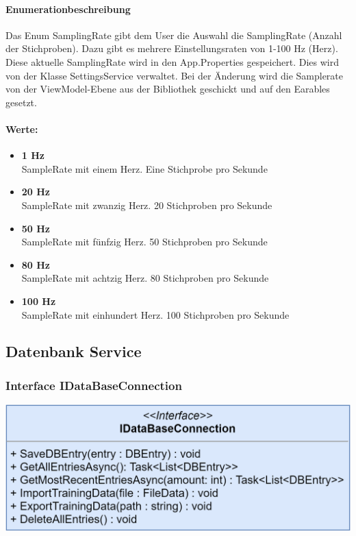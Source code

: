 \documentclass[a4paper,12pt]{article}
\begin{document}
	\paragraph{Enumerationbeschreibung}
	Das Enum SamplingRate gibt dem User die Auswahl die SamplingRate (Anzahl der Stichproben). Dazu gibt es mehrere Einstellungsraten von 1-100 Hz (Herz). Diese aktuelle SamplingRate wird in den App.Properties gespeichert. Dies wird von der Klasse SettingsService verwaltet. 
	Bei der Änderung wird die Samplerate von der ViewModel-Ebene aus der Bibliothek geschickt und auf den \Gls{Earables} gesetzt.

	
	\paragraph{Werte:}
	\begin{itemize}
		\item \textbf{1 Hz}\\SampleRate mit einem Herz. Eine Stichprobe pro Sekunde
		\item \textbf{20 Hz}\\SampleRate mit zwanzig Herz. 20 Stichproben pro Sekunde
		\item \textbf{50 Hz}\\SampleRate mit fünfzig Herz. 50 Stichproben pro Sekunde
		\item \textbf{80 Hz}\\SampleRate mit achtzig Herz. 80 Stichproben pro Sekunde
		\item \textbf{100 Hz}\\SampleRate mit einhundert Herz. 100 Stichproben pro Sekunde
	\end{itemize}
	
	
	
	
	
	
	
\subsection{Datenbank Service}
\subsubsection{Interface IDataBaseConnection}
\includegraphics{bilder/EMKlassen/IDataBaseConnectionInterface.png}
\end{document}
